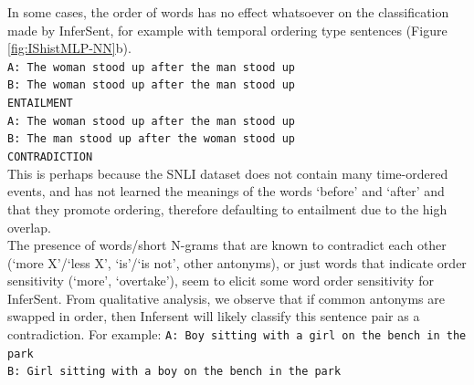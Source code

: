 \documentclass[10pt,letterpaper]{article}
\begin{document}
In some cases, the order of words has no effect whatsoever on the classification made by InferSent, for example with temporal ordering type sentences (Figure \ref{fig:IShistMLP-NN}b).\\
{\tt  A: The woman stood up after the man stood up \\ B: The woman stood up after the man stood up \\ ENTAILMENT \\}{\tt A: The woman stood up after the man stood up \\ B: The man stood up after the woman stood up \\ CONTRADICTION}\\
This is perhaps because the SNLI dataset does not contain many time-ordered events, and has not learned the meanings of the words `before' and `after' and that they promote ordering, therefore defaulting to entailment due to the high overlap.\\
The presence of words/short N-grams that are known to contradict each other (`more X'/`less X', `is'/`is not', other antonyms), or just words that indicate order sensitivity (`more', `overtake'), seem to elicit some word order sensitivity for InferSent.  
From qualitative analysis, we observe that if common antonyms are swapped in order, then Infersent will likely classify this sentence pair as a contradiction. For example:
{\tt A: Boy sitting with a girl on the bench in the park \\ B: Girl sitting with a boy on the bench in the park}
\end{document}
